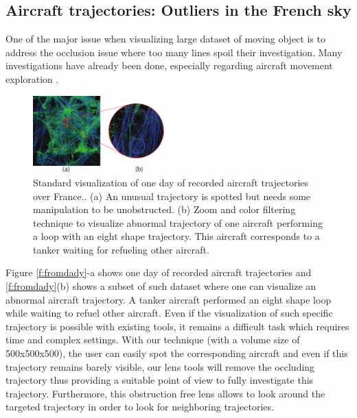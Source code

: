 \subsection{Aircraft trajectories: Outliers in the French sky}
%
%
One of the major issue when visualizing large dataset of moving object is to address the occlusion issue where too many lines spoil their investigation. Many investigations have already been done, especially regarding aircraft movement exploration \cite{hurter2014interactive}.
\begin{figure} 
\includegraphics [width=0.45\textwidth]{images/aircraft.pdf} 
\caption{ Standard visualization of one day of recorded aircraft trajectories over France.\cite{hurter2009fromdady}. (a) An unusual trajectory is spotted but needs some manipulation to be unobstructed. (b) Zoom and color filtering technique to visualize abnormal trajectory of one aircraft performing a loop with an eight shape trajectory. This aircraft corresponds to a tanker waiting for refueling other aircraft.}
\label{f:fromdady}
\end{figure}
Figure \autoref{f:fromdady}-a shows one day of recorded aircraft trajectories and \autoref{f:fromdady}(b) shows a subset of such dataset where one can visualize an abnormal aircraft trajectory. A tanker aircraft performed an eight shape loop while waiting to refuel other aircraft. Even if the visualization of such specific trajectory is possible with existing tools, it remains a difficult task which requires time and complex settings. With our technique (with a volume size of 500x500x500), the user can easily spot the corresponding aircraft and even if this trajectory remains barely visible, our lens tools will remove the occluding trajectory thus providing a suitable point of view to fully investigate this trajectory. Furthermore, this obstruction free lens allows to look around the targeted trajectory in order to look for neighboring trajectories.

